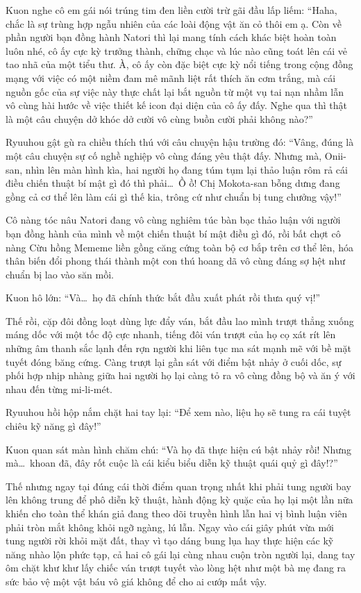 \documentclass[../main.tex]{subfiles}
\begin{document}
Kuon nghe cô em gái nói trúng tim đen liền cười trừ gãi đầu lấp liếm: ``Haha, chắc là sự trùng hợp ngẫu nhiên của các loài động vật ăn cỏ thôi em ạ. Còn về phần người bạn đồng hành Natori thì lại mang tính cách khác biệt hoàn toàn luôn nhé, cô ấy cực kỳ trưởng thành, chững chạc và lúc nào cũng toát lên cái vẻ tao nhã của một tiểu thư. À, cô ấy còn đặc biệt cực kỳ nổi tiếng trong cộng đồng mạng với việc có một niềm đam mê mãnh liệt rất thích ăn cơm trắng, mà cái nguồn gốc của sự việc này thực chất lại bắt nguồn từ một vụ tai nạn nhầm lẫn vô cùng hài hước về việc thiết kế icon đại diện của cô ấy đấy. Nghe qua thì thật là một câu chuyện dở khóc dở cười vô cùng buồn cười phải không nào?''

Ryuuhou gật gù ra chiều thích thú với câu chuyện hậu trường đó: ``Vâng, đúng là một câu chuyện sự cố nghề nghiệp vô cùng đáng yêu thật đấy. Nhưng mà, Onii-san, nhìn lên màn hình kìa, hai người họ đang túm tụm lại thảo luận rôm rả cái điều chiến thuật bí mật gì đó thì phải\dots\ Ồ ồ! Chị Mokota-san bỗng dưng đang gồng cả cơ thể lên làm cái gì thế kia, trông cứ như chuẩn bị tung chưởng vậy!''

Cô nàng tóc nâu Natori đang vô cùng nghiêm túc bàn bạc thảo luận với người bạn đồng hành của mình về một chiến thuật bí mật điều gì đó, rồi bất chợt cô nàng Cừu hồng Mememe liền gồng căng cứng toàn bộ cơ bắp trên cơ thể lên, hóa thân biến đổi phong thái thành một con thú hoang dã vô cùng đáng sợ hệt như chuẩn bị lao vào săn mồi.

Kuon hô lớn: ``Và\dots\ họ đã chính thức bắt đầu xuất phát rồi thưa quý vị!''

Thế rồi, cặp đôi đồng loạt dùng lực đẩy ván, bắt đầu lao mình trượt thẳng xuống máng dốc với một tốc độ cực nhanh, tiếng đôi ván trượt của họ cọ xát rít lên những âm thanh sắc lạnh đến rợn người khi liên tục ma sát mạnh mẽ với bề mặt tuyết đóng băng cứng. Càng trượt lại gần sát với điểm bật nhảy ở cuối dốc, sự phối hợp nhịp nhàng giữa hai người họ lại càng tỏ ra vô cùng đồng bộ và ăn ý với nhau đến từng mi-li-mét.

Ryuuhou hồi hộp nắm chặt hai tay lại: ``Để xem nào, liệu họ sẽ tung ra cái tuyệt chiêu kỹ năng gì đây!''

Kuon quan sát màn hình chăm chú: ``Và họ đã thực hiện cú bật nhảy rồi! Nhưng mà\dots\ khoan đã, đây rốt cuộc là cái kiểu biểu diễn kỹ thuật quái quỷ gì đây!?''

Thế nhưng ngay tại đúng cái thời điểm quan trọng nhất khi phải tung người bay lên không trung để phô diễn kỹ thuật, hành động kỳ quặc của họ lại một lần nữa khiến cho toàn thể khán giả đang theo dõi truyền hình lẫn hai vị bình luận viên phải tròn mắt không khỏi ngỡ ngàng, lú lẫn. Ngay vào cái giây phút vừa mới tung người rời khỏi mặt đất, thay vì tạo dáng bung lụa hay thực hiện các kỹ năng nhào lộn phức tạp, cả hai cô gái lại cùng nhau cuộn tròn người lại, dang tay ôm chặt khư khư lấy chiếc ván trượt tuyết vào lòng hệt như một bà mẹ đang ra sức bảo vệ một vật báu vô giá không để cho ai cướp mất vậy.
\end{document}
